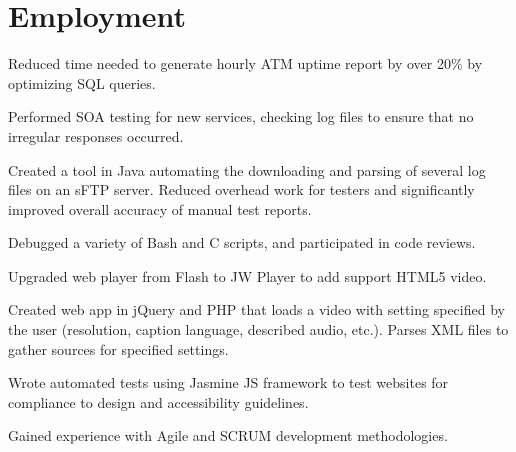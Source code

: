 \documentclass[]{deedy-resume-openfont}
\begin{document}
\begin{minipage}[t]{0.66\textwidth} 


\section{Employment}

\vspace{\topsep} %
\begin{tightemize}
\item Reduced time needed to generate hourly ATM uptime report by over 20\% by optimizing SQL queries.   
\item Performed SOA testing for new services, checking log files to ensure that no irregular responses occurred.
\item Created a tool in Java automating the downloading and parsing of several log files on an sFTP server. Reduced overhead work for testers and significantly improved overall accuracy of manual test reports. %
\item Debugged a variety of Bash and C scripts, and participated in code reviews.
\end{tightemize}
\sectionsep

\begin{tightemize}
\item Upgraded web player from Flash to JW Player to add support HTML5 video.
\item Created web app in jQuery and PHP that loads a video with setting specified by the user (resolution, caption language, described audio, etc.). Parses XML files to gather sources for specified settings.
\item Wrote automated tests using Jasmine JS framework to test websites for compliance to design and accessibility guidelines.
\item Gained experience with Agile and SCRUM development methodologies.
\end{tightemize}
\sectionsep


\end{minipage}
\end{document}
